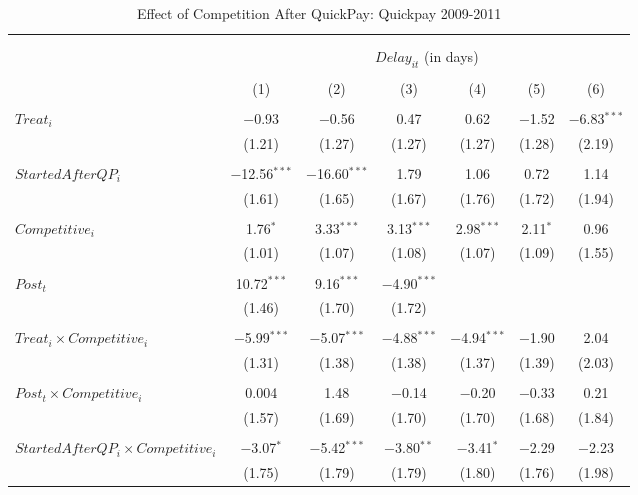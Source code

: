 \documentclass[
]{article}
\begin{document}
\begin{table}[H] \centering 
  \caption{Effect of Competition After QuickPay: Quickpay 2009-2011} 
  \label{} 
\small 
\begin{tabular}{@{\extracolsep{-3pt}}lcccccc} 
\\[-1.8ex]\hline 
\hline \\[-1.8ex] 
\\[-1.8ex] & \multicolumn{6}{c}{$Delay_{it}$ (in days)} \\ 
\\[-1.8ex] & (1) & (2) & (3) & (4) & (5) & (6)\\ 
\hline \\[-1.8ex] 
 $Treat_i$ & $-$0.93 & $-$0.56 & 0.47 & 0.62 & $-$1.52 & $-$6.83$^{***}$ \\ 
  & (1.21) & (1.27) & (1.27) & (1.27) & (1.28) & (2.19) \\ 
  & & & & & & \\ 
 $StartedAfterQP_i$ & $-$12.56$^{***}$ & $-$16.60$^{***}$ & 1.79 & 1.06 & 0.72 & 1.14 \\ 
  & (1.61) & (1.65) & (1.67) & (1.76) & (1.72) & (1.94) \\ 
  & & & & & & \\ 
 $Competitive_i$ & 1.76$^{*}$ & 3.33$^{***}$ & 3.13$^{***}$ & 2.98$^{***}$ & 2.11$^{*}$ & 0.96 \\ 
  & (1.01) & (1.07) & (1.08) & (1.07) & (1.09) & (1.55) \\ 
  & & & & & & \\ 
 $Post_t$ & 10.72$^{***}$ & 9.16$^{***}$ & $-$4.90$^{***}$ &  &  &  \\ 
  & (1.46) & (1.70) & (1.72) &  &  &  \\ 
  & & & & & & \\ 
 $Treat_i \times Competitive_i$ & $-$5.99$^{***}$ & $-$5.07$^{***}$ & $-$4.88$^{***}$ & $-$4.94$^{***}$ & $-$1.90 & 2.04 \\ 
  & (1.31) & (1.38) & (1.38) & (1.37) & (1.39) & (2.03) \\ 
  & & & & & & \\ 
 $Post_t \times Competitive_i$ & 0.004 & 1.48 & $-$0.14 & $-$0.20 & $-$0.33 & 0.21 \\ 
  & (1.57) & (1.69) & (1.70) & (1.70) & (1.68) & (1.84) \\ 
  & & & & & & \\ 
 $StartedAfterQP_i \times Competitive_i$ & $-$3.07$^{*}$ & $-$5.42$^{***}$ & $-$3.80$^{**}$ & $-$3.41$^{*}$ & $-$2.29 & $-$2.23 \\ 
  & (1.75) & (1.79) & (1.79) & (1.80) & (1.76) & (1.98) \\ 

\end{tabular}
\end{table}
\end{document}
